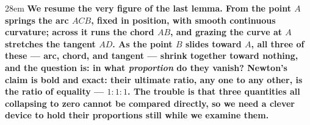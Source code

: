 \documentclass[border=4pt]{standalone}
\begin{document}
\begin{varwidth}{28em}
\large\bfseries
We resume the very figure of the last lemma. From the point $A$ springs the arc $ACB$,      fixed in position, with smooth continuous curvature; across it runs the chord $AB$, and grazing      the curve at $A$ stretches the tangent $AD$. As the point $B$ slides toward $A$, all three of      these --- arc, chord, and tangent --- shrink together toward nothing, and the question is:      in what \emph{proportion} do they vanish? Newton's claim is bold and exact: their ultimate ratio,      any one to any other, is the ratio of equality --- $1:1:1$. The trouble is that three      quantities all collapsing to zero cannot be compared directly, so we need a clever device to hold      their proportions still while we examine them.
\end{varwidth}
\end{document}
